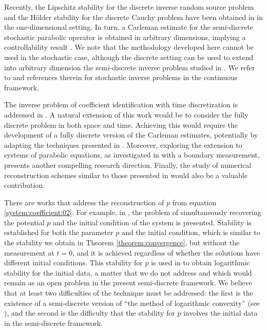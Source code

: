 \documentclass{amsart}
\numberwithin{equation}{section}
\begin{document}
    Recently, the Lipschitz stability for the discrete inverse random source problem and the Hölder stability for the discrete Cauchy problem have been obtained in \cite{Wu_2024} in the one-dimensional setting. In turn, a Carleman estimate for the semi-discrete stochastic parabolic operator is obtained in arbitrary dimensions, implying a controllability result \cite{LPP:2024}. We note that the methodology developed here cannot be used in the stochastic case, although the discrete setting can be used to extend into arbitrary dimension the semi-discrete inverse problem studied in \cite{Wu_2024}. We refer to \cite{QL:YW:2024} and references therein for stochastic inverse problems in the continuous framework.
    
    The inverse problem of coefficient identification with time discretization is addressed in \cite{Klibanov2024_tiempo_discreto}. A natural extension of this work would be to consider the fully discrete problem in both space and time. Achieving this would require the development of a fully discrete version of the Carleman estimates, potentially by adapting the techniques presented in \cite{GCHS2021,LMZP2023}. Moreover, exploring the extension to systems of parabolic equations, as investigated in \cite{MFG_Klibavov_2023} with a boundary measurement, presents another compelling research direction. Finally, the study of numerical reconstruction schemes similar to those presented in \cite{CNumerico_Klibanov_2025} would also be a valuable contribution.
    
    There are works that address the reconstruction of $p$ from equation \eqref{system:coefficient:02}. For example, in \cite{YZ:2001}, the problem of simultaneously recovering the potential $p$ and the initial condition of the system is presented. Stability is established for both the parameter $p$ and the initial condition, which is similar to the stability we obtain in Theorem \ref{theorem:convergence}, but without the measurement at $t = 0$, and it is achieved regardless of whether the solutions have different initial conditions. This stability for $p$ is used in \cite{YZ:2001} to obtain logarithmic stability for the initial data, a matter that we do not address and which would remain as an open problem in the present semi-discrete framework. We believe that at least two difficulties of the technique must be addressed: the first is the existence of a semi-discrete version of ``the method of logarithmic convexity'' (see \cite[equation 2.20]{YZ:2001}), and the second is the difficulty that the stability for $p$ involves the initial data in the semi-discrete framework.
    
\end{document}
